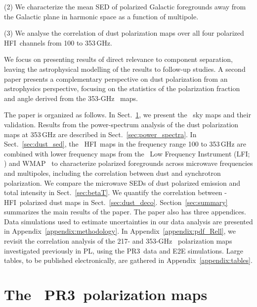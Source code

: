 \documentclass[longauth,traditabstract]{aa}
\newcommand{\planck}{\Planck}
\newcommand{\WMAP}{WMAP}
\newcommand{\HFI}{HFI}
\newcommand{\LFI}{LFI}
\newcommand{\PR}{PR3}
\begin{document}
\noindent
(2) We characterize the mean SED of polarized Galactic foregrounds away from the Galactic plane in harmonic space as a function of multipole. 

\noindent
(3) We analyse the correlation of dust polarization maps over all four polarized \HFI\ channels from 100 to 353\,GHz.
 
We focus on presenting results of direct relevance to component separation, leaving the astrophysical modelling of the results to follow-up studies. 
A second paper \citep{planck2016-l11B} presents a complementary perspective on dust polarization from an astrophysics perspective, focusing on the statistics of the polarization fraction and angle
derived from the 353-GHz \Planck\ maps.

The paper is organized as follows. 
%
In Sect.~\ref{sec:data}, we present the \planck\ sky maps and their validation.
%
Results from the power-spectrum analysis of the dust polarization maps at 353\,GHz are described in Sect.~\ref{sec:power_spectra}.
%
In Sect.~\ref{sec:dust_sed}, the \Planck\ \HFI\ maps in the frequency range 100 to 353\,GHz are combined with lower frequency maps from the \Planck\ Low Frequency Instrument (\LFI; \citealp{planck2016-l02}) and \WMAP\ \citep{bennett2012} to characterize polarized foregrounds across microwave frequencies and multipoles, including the correlation between dust and synchrotron polarization.
%
We compare the microwave SEDs of dust polarized emission and total intensity in Sect.~\ref{sec:betaT}.
%
We quantify the correlation between \Planck-HFI\ polarized dust maps in Sect.~\ref{sec:dust_deco}. 
%
Section~\ref{sec:summary} summarizes the main results of the paper.
%
The paper also has three appendices. Data simulations used to estimate uncertainties in our data analysis are presented in Appendix~\ref{appendix:methodology}. 
%
In Appendix~\ref{appendix:pdf_Rell}, we revisit the correlation analysis of the 217- and 353-GHz \Planck\ polarization maps investigated previously in PL, using the \PR\ data and E2E simulations.
%
Large tables, to be published electronically, are gathered in Appendix~\ref{appendix:tables}.

\section{The \Planck\ \PR\ polarization maps}
\label{sec:data}

\end{document}
